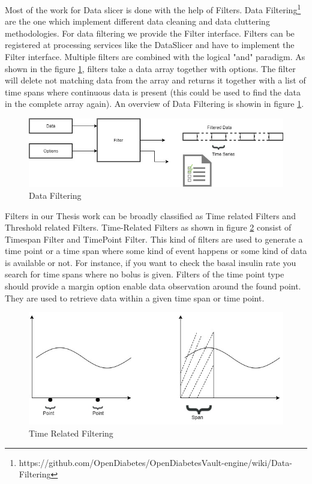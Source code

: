 \documentclass[article,type=msc,colorback,accentcolor=tud9c,twoside,11pt]{tudthesis}
\begin{document}
Most of the work for Data slicer is done with the help of Filters. Data Filtering\footnote{https://github.com/OpenDiabetes/OpenDiabetesVault-engine/wiki/Data-Filtering} are the one which implement different data cleaning and data cluttering methodologies. For data filtering we provide the Filter interface. Filters can be registered at processing services like the DataSlicer and have to implement the Filter interface. Multiple filters are combined with the logical "and" paradigm. As shown in the figure \ref{fig:Filters}, filters take a data array together with options. The filter will delete not matching data from the array and returns it together with a list of time spans where continuous data is present (this could be used to find the data in the complete array again).  An overview of Data Filtering is showin in figure \ref{fig:Filters}.
\begin{figure}[h]
	\centering
	\includegraphics[scale=0.7]{Filters.jpg}
	\caption{Data Filtering}
	\label{fig:Filters}
\end{figure}
Filters in our Thesis work can be broadly classified as Time related Filters and
Threshold related Filters. Time-Related Filters as shown in figure \ref{fig:TimeRelated} consist of Timespan Filter and TimePoint Filter. This kind of filters are used to generate a time point or a time span where some kind of event happens or some kind of data is available or not. For instance, if you want to check the basal insulin rate you search for time spans where no bolus is given. Filters of the time point type should provide a margin option enable data observation around the found point. They are used to retrieve data within a given time span or time point.
\begin{figure}[h]
	\centering
	\includegraphics[scale=0.7]{TimeRelated.jpg}
	\caption{Time Related Filtering}
	\label{fig:TimeRelated}
\end{figure}
\end{document}
